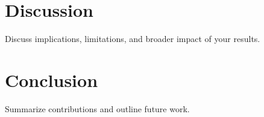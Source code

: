 \documentclass[11pt, letterpaper]{article}
\begin{document}

\section{Discussion}
\label{sec:discussion}

{{Discuss implications, limitations, and broader impact of your results.}}

\section{Conclusion}
\label{sec:conclusion}

{{Summarize contributions and outline future work.}}



\end{document}
